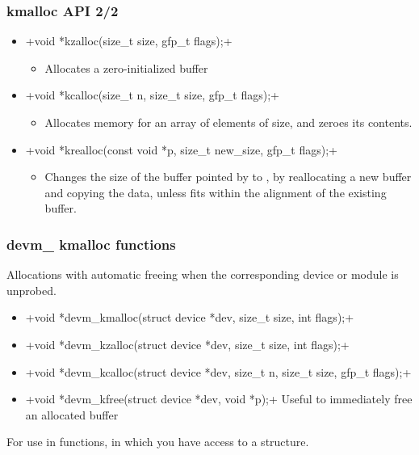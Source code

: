 \begin{frame}[fragile]
  \frametitle{kmalloc API 2/2}
  \begin{itemize}
  \item {}+void *kzalloc(size_t size, gfp_t flags);+
    \begin{itemize}
    \item Allocates a zero-initialized buffer
    \end{itemize}
  \item {}+void *kcalloc(size_t n, size_t size, gfp_t flags);+
    \begin{itemize}
    \item Allocates memory for an array of  elements of
       size, and zeroes its contents.
    \end{itemize}
  \item {}+void *krealloc(const void *p, size_t new_size, gfp_t flags);+
    \begin{itemize}
    \item Changes the size of the buffer pointed by  to
      , by reallocating a new buffer and copying the
      data, unless  fits within the alignment of
      the existing buffer.
    \end{itemize}
  \end{itemize}
\end{frame}

\begin{frame}
  \frametitle{devm\_ kmalloc functions}
  Allocations with automatic freeing when the corresponding device or module is unprobed.
  \begin{itemize}
  \small
  \item {}+void *devm_kmalloc(struct device *dev, size_t size, int flags);+
  \item {}+void *devm_kzalloc(struct device *dev, size_t size, int flags);+
  \item {}+void *devm_kcalloc(struct device *dev, size_t n, size_t size, gfp_t flags);+
  \item {}+void *devm_kfree(struct device *dev, void *p);+
        Useful to immediately free an allocated buffer
  \end{itemize}
  \normalsize
  For use in  functions, in which you have access to a
   structure.
\end{frame}


